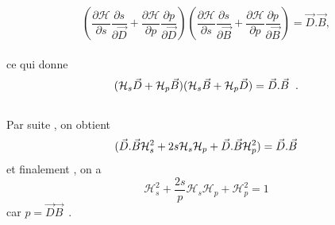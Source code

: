 \documentclass[12pt,a4paper, openany]{report}
\begin{document}
	\begin{equation*}
		\left(\frac{\partial{\mathcal{H}}}{\partial{\textit{s}}}\frac{\partial{\textit{s}}}{\partial{\vec{D}}}+\frac{\partial{\mathcal{H}}}{\partial{p}}\frac{\partial{p}}{\partial{\vec{D}}}\right)\left(\frac{\partial{\mathcal{H}}}{\partial{\textit{s}}}\frac{\partial{\textit{s}}}{\partial{\vec{B}}}+\frac{\partial{\mathcal{H}}}{\partial{p}}\frac{\partial{p}}{\partial{\vec{B}}}\right)= \vec{D}.\vec{B} , 
	\end{equation*}
	\\
	ce qui donne
	\begin{equation*} 
		(\mathcal{H}_s\vec{D}+\mathcal{H}_p\vec{B})(\mathcal{H}_s\vec{B}+\mathcal{H}_p\vec{D})=\vec{D}.\vec{B}\hspace{0.2cm} .  
	\end{equation*}
	\\
	Par suite , on obtient 
	\begin{equation*}  
		(\vec{D}.\vec{B}\mathcal{H}^{2}_s+2s\mathcal{H}_s\mathcal{H}_p+\vec{D}.\vec{B}\mathcal{H}^{2}_p)=\vec{D}.\vec{B} \\
	\end{equation*}
	et finalement , on a 
	\begin{equation}
		\mathcal{H}^{2}_s+\frac{2s}{p}\mathcal{H}_s\mathcal{H}_p+\mathcal{H}^{2}_p =1 
	\end{equation}
	car $p=\vec{D}\vec{B}$ \,.\\
	
\end{document}
